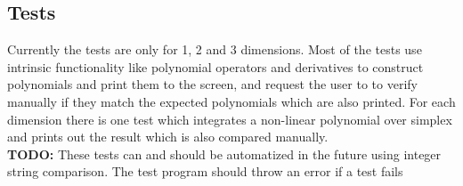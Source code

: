 \subsection{Tests}

\noindent
Currently the tests are only for 1, 2 and 3 dimensions. Most of the tests use intrinsic functionality like polynomial operators and derivatives to construct polynomials and print them to the screen, and request the user to to verify manually if they match the expected polynomials which are also printed. For each dimension there is one test which integrates a non-linear polynomial over simplex and prints out the result which is also compared manually. \\

\textbf{TODO:} These tests can and should be automatized in the future using integer string comparison. The test program should throw an error if a test fails
